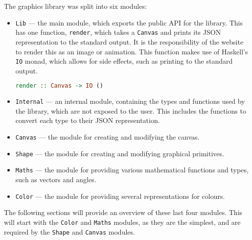 \documentclass[../main.tex]{subfiles}
\begin{document}
            The graphics library was split into six modules:
            \begin{itemize}
                \item \texttt{Lib} — the main module, which exports the public API for the library.
                      This has one function, \texttt{render}, which takes a \texttt{Canvas} and
                          prints its JSON representation to the standard output.
                      It is the responsibility of the website to render this as an image or
                          animation.
                      This function makes use of Haskell's \texttt{IO} monad, which allows for side
                          effects, such as printing to the standard output.

                      \begin{lstlisting}[language={Haskell}, label={lst:lib}, caption={The 
                        \texttt{render} function.
                        The \texttt{IO ()} return type means that the function has side effects, 
                        specifically printing to the standard output, but no value is returned.}]
render :: Canvas -> IO ()\end{lstlisting}

                \item \texttt{Internal} — an internal module, containing the types and
                      functions used by the library, which are not exposed to the user.
                      This includes the functions to convert each type to their JSON representation.

                \item \texttt{Canvas} — the module for creating and modifying the canvas.

                \item \texttt{Shape} — the module for creating and modifying graphical primitives.

                \item \texttt{Maths} — the module for providing various mathematical functions and
                      types, such as vectors and angles.

                \item \texttt{Color} — the module for providing several representations for colours.
            \end{itemize}

            The following sections will provide an overview of these last four modules.
            This will start with the \texttt{Color} and \texttt{Maths} modules, as they are
                the simplest, and are required by the \texttt{Shape} and \texttt{Canvas}
                modules.
\end{document}
